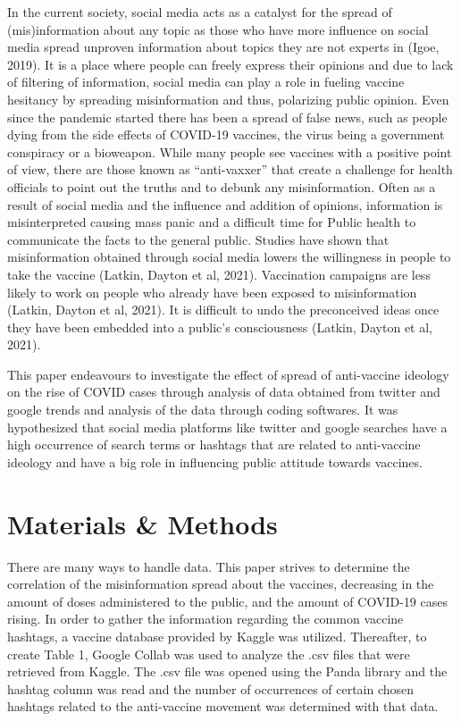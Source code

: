 \documentclass[10pt,twocolumn,letterpaper]{article}
\begin{document}
In the current society, social media acts as a catalyst for the spread of (mis)information about any topic as those who have more influence on social media spread unproven information about topics they are not experts in (Igoe, 2019). It is a place where people can freely express their opinions and due to lack of filtering of information, social media can play a role in fueling vaccine hesitancy by spreading misinformation and thus, polarizing public opinion. Even since the pandemic started there has been a spread of false news, such as people dying from the side effects of COVID-19 vaccines, the virus being a government conspiracy or a bioweapon. While many people see vaccines with a positive point of view, there are those known as “anti-vaxxer” that create a challenge for health officials to point out the truths and to debunk any misinformation. Often as a result of social media and the influence and addition of opinions, information is misinterpreted causing mass panic and a difficult time for Public health to communicate the facts to the general public. Studies have shown that misinformation obtained through social media lowers the willingness in people to take the vaccine (Latkin, Dayton et al, 2021). Vaccination campaigns are less likely to work on people who already have been exposed to misinformation (Latkin, Dayton et al, 2021). It is difficult to undo the preconceived ideas once they have been embedded into a public’s consciousness (Latkin, Dayton et al, 2021). 

This paper endeavours to investigate the effect of spread of anti-vaccine ideology on the rise of COVID cases through analysis of data obtained from twitter and google trends and analysis of the data through coding softwares. It was hypothesized that social media platforms like twitter and google searches have a high occurrence of search terms or hashtags that are related to anti-vaccine ideology and have a big role in influencing public attitude towards vaccines. 

\section{Materials \& Methods}

There are many ways to handle data. This paper strives to determine the correlation of the misinformation spread about the vaccines, decreasing in the amount of doses administered to the public, and the amount of COVID-19 cases rising. In order to gather the information regarding the common vaccine hashtags, a vaccine database provided by Kaggle was utilized. Thereafter, to create Table 1, Google Collab was used to analyze the .csv files that were retrieved from Kaggle. The .csv file was opened using the Panda library and the hashtag column was read and the number of occurrences of certain chosen hashtags related to the anti-vaccine movement was determined with that data. 
\end{document}
